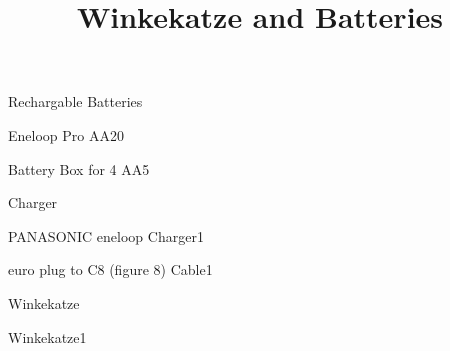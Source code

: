 \def\papersize{5}




\title{Winkekatze and Batteries}

\begin{checklist}{Rechargable Batteries}
  \item{Eneloop Pro AA}{20}
  \item{Battery Box for 4 AA}{5}
\end{checklist}

\begin{checklist}{Charger}
  \item{PANASONIC eneloop Charger}{1}
  \item{euro plug to C8 (figure 8) Cable}{1}
\end{checklist}

\begin{checklist}{Winkekatze}
  \item{Winkekatze}{1}
\end{checklist}


